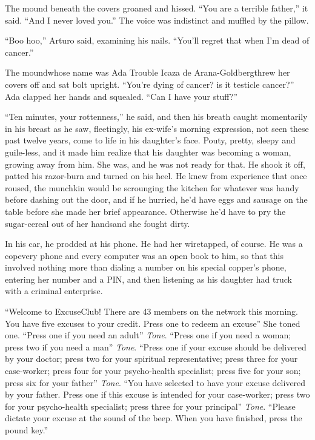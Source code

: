 The mound beneath the covers groaned and hissed. “You are a
terrible father,” it said. “And I never loved you.” The voice was
indistinct and muffled by the pillow.

“Boo hoo,” Arturo said, examining his nails. “You’ll regret that
when I’m dead of cancer.”

The mound{\dash}whose name was Ada Trouble Icaza de Arana-Goldberg{\dash}threw
her covers off and sat bolt upright. “You’re dying of cancer? is it
testicle cancer?” Ada clapped her hands and squealed. “Can I have
your stuff?”

“Ten minutes, your rottenness,” he said, and then his breath caught
momentarily in his breast as he saw, fleetingly, his ex-wife’s
morning expression, not seen these past twelve years, come to life
in his daughter’s face. Pouty, pretty, sleepy and guile-less, and
it made him realize that his daughter was becoming a woman, growing
away from him. She was, and he was not ready for that. He shook it
off, patted his razor-burn and turned on his heel. He knew from
experience that once roused, the munchkin would be scrounging the
kitchen for whatever was handy before dashing out the door, and if
he hurried, he’d have eggs and sausage on the table before she made
her brief appearance. Otherwise he’d have to pry the sugar-cereal
out of her hands{\dash}and she fought dirty.

\tb

In his car, he prodded at his phone. He had her wiretapped, of
course. He was a cop{\dash}every phone and every computer was an open
book to him, so that this involved nothing more than dialing a
number on his special copper’s phone, entering her number and a
PIN, and then listening as his daughter had truck with a criminal
enterprise.

“Welcome to ExcuseClub! There are 43 members on the network this
morning. You have five excuses to your credit. Press one to redeem
an excuse{\dash}” She toned one. “Press one if you need an adult{\dash}”
\emph{Tone}. “Press one if you need a woman; press two if you need
a man{\dash}” \emph{Tone}. “Press one if your excuse should be delivered
by your doctor; press two for your spiritual representative; press
three for your case-worker; press four for your psycho-health
specialist; press five for your son; press six for your father{\dash}”
\emph{Tone}. “You have selected to have your excuse delivered by
your father. Press one if this excuse is intended for your
case-worker; press two for your psycho-health specialist; press
three for your principal{\dash}” \emph{Tone}. “Please dictate your excuse
at the sound of the beep. When you have finished, press the pound
key.”

